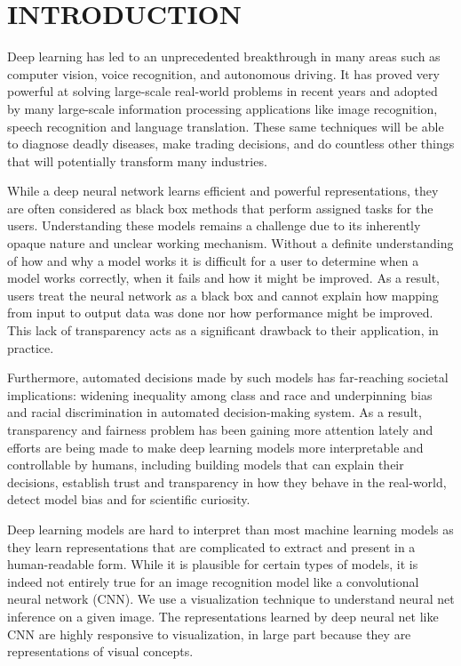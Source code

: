 %
%
\chapter{INTRODUCTION}
\thispagestyle{empty}


Deep learning has led to an unprecedented breakthrough in many areas such as computer vision, voice recognition, and autonomous driving.  It has proved very powerful at solving large-scale real-world problems in recent years and adopted by many large-scale information processing applications like image recognition, speech recognition and language translation.  These same techniques will be able to diagnose deadly diseases,  make trading decisions, and do countless other things that will potentially transform many industries. 

While a deep neural network learns efficient and powerful representations, they are often considered as black box methods that perform assigned tasks for the users.  Understanding these models remains a challenge due to its inherently opaque nature and unclear working mechanism.  Without a definite understanding of how and why a model works it is difficult for a user to determine when a model works correctly, when it fails and how it might be improved. As a result, users treat the neural network as a black box and cannot explain how mapping from input to output data was done nor how performance might be improved. This lack of transparency acts as a significant drawback to their application, in practice.

Furthermore, automated decisions made by such models has far-reaching societal implications: widening inequality among class and race and underpinning bias and racial discrimination in automated decision-making system. As a result, transparency and fairness problem has been gaining more attention lately and efforts are being made to make deep learning models more interpretable and controllable by humans,  including building models that can explain their decisions, establish trust and transparency in how they behave in the real-world, detect model bias and for scientific curiosity.

Deep learning models are hard to interpret than most machine learning models as they learn representations that are complicated to extract and present in a human-readable form.  While it is plausible for certain types of models, it is indeed not entirely true for an image recognition model like a convolutional neural network (CNN).  We use a visualization technique to understand neural net inference on a given image.  The representations learned by deep neural net like CNN are highly responsive to visualization, in large part because they are representations of visual concepts.

